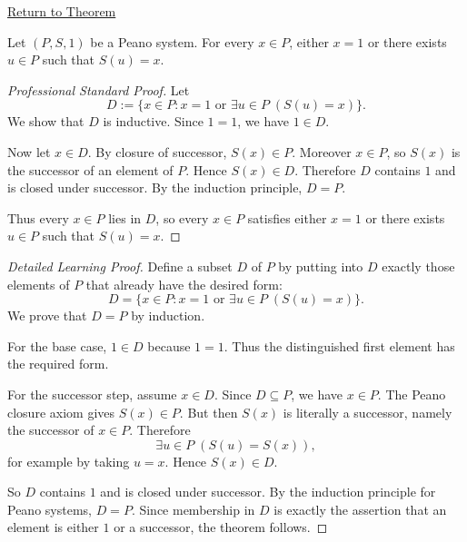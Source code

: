 \newpage
{}
\label{prf:every-element-is-one-or-a-successor}

\begin{remark*}[Return]
\hyperref[thm:every-element-is-one-or-a-successor]{Return to Theorem}
\end{remark*}

\begin{theorem*}
Let $(P,S,1)$ be a Peano system. For every $x \in P$, either $x=1$ or there
exists $u \in P$ such that $S(u)=x$.
\end{theorem*}

\begin{proof}[Professional Standard Proof]
\LRAProofBodyStart
Let
\[
D:=\{x\in P:x=1 \text{ or } \exists u\in P\;(S(u)=x)\}.
\]
We show that $D$ is inductive. Since $1=1$, we have $1\in D$.

Now let $x\in D$. By closure of successor, $S(x)\in P$. Moreover $x\in P$,
so $S(x)$ is the successor of an element of $P$. Hence $S(x)\in D$.
Therefore $D$ contains $1$ and is closed under successor. By the induction
principle, $D=P$.

Thus every $x\in P$ lies in $D$, so every $x\in P$ satisfies either $x=1$ or
there exists $u\in P$ such that $S(u)=x$.
\end{proof}

\begin{proof}[Detailed Learning Proof]
\LRAProofBodyStart
Define a subset $D$ of $P$ by putting into $D$ exactly those elements of $P$
that already have the desired form:
\[
D=\{x\in P:x=1 \text{ or } \exists u\in P\;(S(u)=x)\}.
\]
We prove that $D=P$ by induction.

For the base case, $1\in D$ because $1=1$. Thus the distinguished first
element has the required form.

For the successor step, assume $x\in D$. Since $D\subseteq P$, we have
$x\in P$. The Peano closure axiom gives $S(x)\in P$. But then $S(x)$ is
literally a successor, namely the successor of $x\in P$. Therefore
\[
\exists u\in P\;(S(u)=S(x)),
\]
for example by taking $u=x$. Hence $S(x)\in D$.

So $D$ contains $1$ and is closed under successor. By the induction principle
for Peano systems, $D=P$. Since membership in $D$ is exactly the assertion
that an element is either $1$ or a successor, the theorem follows.
\end{proof}

